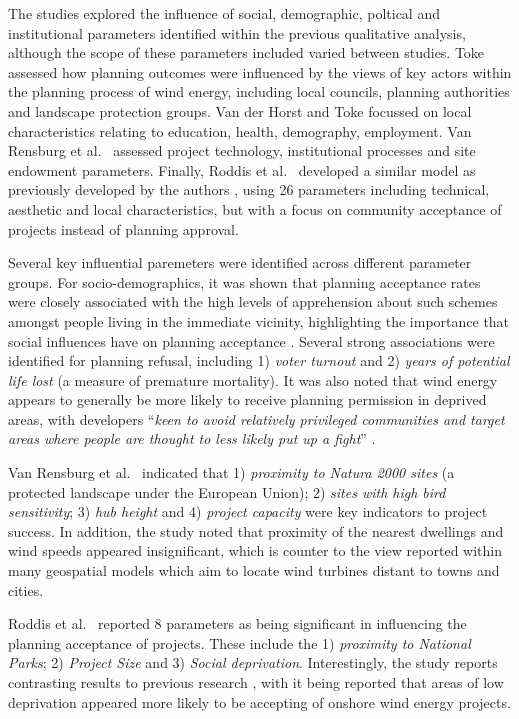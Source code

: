 \documentclass[a4paper,]{article}
\theoremstyle{definition}
\theoremstyle{definition}
\theoremstyle{definition}
\theoremstyle{remark}
\begin{document}
The studies explored the influence of social, demographic, poltical and institutional parameters identified within the previous qualitative analysis, although the scope of these parameters included varied between studies. Toke \citep{Toke2005} assessed how planning outcomes were influenced by the views of key actors within the planning process of wind energy, including local councils, planning authorities and landscape protection groups. Van der Horst and Toke \citeyearpar{VanderHorst2010} focussed on local characteristics relating to education, health, demography, employment. Van Rensburg et al.~\citep{VanRensburg20} assessed project technology, institutional processes and site endowment parameters. Finally, Roddis et al.~\citep{Roddis2018} developed a similar model as previously developed by the authors \citep{Harper2017}, using 26 parameters including technical, aesthetic and local characteristics, but with a focus on community acceptance of projects instead of planning approval.

Several key influential paremeters were identified across different parameter groups. For socio-demographics, it was shown that planning acceptance rates were closely associated with the high levels of apprehension about such schemes amongst people living in the immediate vicinity, highlighting the importance that social influences have on planning acceptance \citep{Toke2005}. Several strong associations were identified for planning refusal, including 1) \emph{voter turnout} and 2) \emph{years of potential life lost} (a measure of premature mortality). It was also noted that wind energy appears to generally be more likely to receive planning permission in deprived areas, with developers ``\emph{keen to avoid relatively privileged communities and target areas where people are thought to less likely put up a fight}'' \citep[p.220]{VanderHorst2010}.

Van Rensburg et al.~\citeyearpar{VanRensburg20} indicated that 1) \emph{proximity to Natura 2000 sites} (a protected landscape under the European Union); 2) \emph{sites with high bird sensitivity}; 3) \emph{hub height} and 4) \emph{project capacity} were key indicators to project success. In addition, the study noted that proximity of the nearest dwellings and wind speeds appeared insignificant, which is counter to the view reported within many geospatial models which aim to locate wind turbines distant to towns and cities.

Roddis et al.~\citep{Roddis2018} reported 8 parameters as being significant in influencing the planning acceptance of projects. These include the 1) \emph{proximity to National Parks}; 2) \emph{Project Size} and 3) \emph{Social deprivation}. Interestingly, the study reports contrasting results to previous research \citep{VanderHorst2010}, with it being reported that areas of low deprivation appeared more likely to be accepting of onshore wind energy projects.
\end{document}
